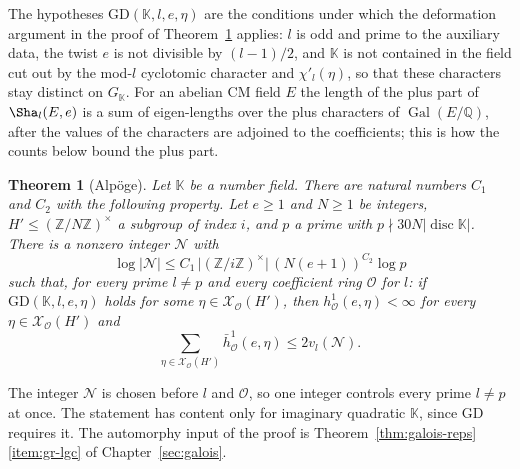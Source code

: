 \documentclass[11pt]{amsbook}
\theoremstyle{plain}
\newtheorem{theorem}{Theorem}[section]
\theoremstyle{definition}
\theoremstyle{remark}
\numberwithin{equation}{section}
\numberwithin{figure}{chapter}
\numberwithin{table}{chapter}
\newcommand{\Q}{\mathbb{Q}}
\newcommand{\Z}{\mathbb{Z}}
\newcommand{\Gal}{\operatorname{Gal}}
\begin{document}
\noindent The hypotheses $\mathrm{GD}(\mathbb K,l,e,\eta)$ are the
conditions under which the deformation argument in the proof of
Theorem~\ref{thm:plus-gk} applies: $l$ is odd and prime to the
auxiliary data, the twist $e$ is not divisible by $(l-1)/2$, and
$\mathbb K$ is not contained in the field cut out by the mod-$l$
cyclotomic character and $\chi'_l(\eta)$, so that these characters
stay distinct on $G_{\mathbb K}$. For an abelian CM field $E$ the
length of the plus part of
$\Sha_l(E,e)$ is a sum of eigen-lengths over the plus characters of
$\Gal(E/\Q)$, after the values of the characters are adjoined to the
coefficients; this is how the counts below bound the plus part.

\begin{theorem}[Alp\"oge]\label{thm:plus-gk}
Let $\mathbb K$ be a number field. There are
natural numbers $C_1$ and $C_2$ with the following
property. Let $e\ge1$ and $N\ge1$ be integers, $H'\le(\Z/N\Z)^\times$ a
subgroup of index $i$, and $p$ a prime with
$p\nmid30N|\operatorname{disc}\mathbb K|$. There is a nonzero integer
$\mathcal N$ with
\[
\log|\mathcal N|\le C_1\,\bigl|(\Z/i\Z)^\times\bigr|\,
(N(e+1))^{C_2}\log p
\]
such that, for every prime $l\ne p$ and every coefficient ring
$\mathcal O$ for
$l$: if $\mathrm{GD}(\mathbb K,l,e,\eta)$ holds for some
$\eta\in\mathcal X_{\mathcal O}(H')$, then
$h^1_{\mathcal O}(e,\eta)<\infty$ for every
$\eta\in\mathcal X_{\mathcal O}(H')$ and
\[
\sum_{\eta\in\mathcal X_{\mathcal O}(H')}\bar h^1_{\mathcal O}(e,
\eta)\le2v_l(\mathcal N).
\]
\end{theorem}

\noindent The integer $\mathcal N$ is chosen
before $l$ and $\mathcal O$, so one integer controls every prime
$l\ne p$ at once. The statement has content only for imaginary
quadratic $\mathbb K$, since $\mathrm{GD}$ requires it. The automorphy
input of the proof is Theorem~\ref{thm:galois-reps}\ref{item:gr-lgc}
of Chapter~\ref{sec:galois}.
\end{document}
